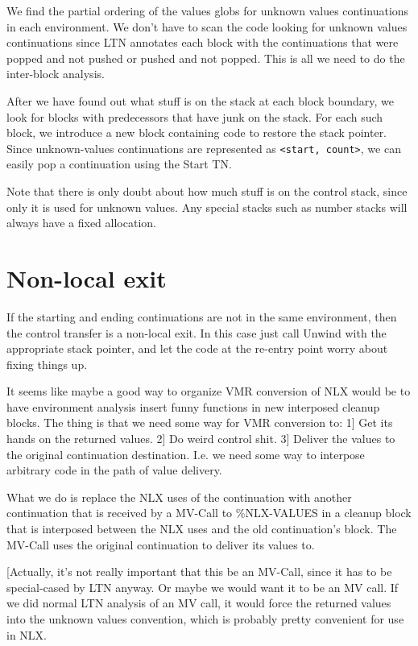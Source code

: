 We find the partial ordering of the values globs for unknown values
continuations in each environment.  We don't have to scan the code looking for
unknown values continuations since LTN annotates each block with the
continuations that were popped and not pushed or pushed and not popped.  This
is all we need to do the inter-block analysis.

After we have found out what stuff is on the stack at each block boundary, we
look for blocks with predecessors that have junk on the stack.  For each such
block, we introduce a new block containing code to restore the stack pointer.
Since unknown-values continuations are represented as \verb+<start, count>+, we can
easily pop a continuation using the Start TN.

Note that there is only doubt about how much stuff is on the control stack,
since only it is used for unknown values.  Any special stacks such as number
stacks will always have a fixed allocation.


\section{Non-local exit}


If the starting and ending continuations are not in the same environment, then
the control transfer is a non-local exit.  In this case just call Unwind with
the appropriate stack pointer, and let the code at the re-entry point worry
about fixing things up.

It seems like maybe a good way to organize VMR conversion of NLX would be to
have environment analysis insert funny functions in new interposed cleanup
blocks.  The thing is that we need some way for VMR conversion to:
 1] Get its hands on the returned values.
 2] Do weird control shit.
 3] Deliver the values to the original continuation destination.
I.e. we need some way to interpose arbitrary code in the path of value
delivery.

What we do is replace the NLX uses of the continuation with another
continuation that is received by a MV-Call to \%NLX-VALUES in a cleanup block
that is interposed between the NLX uses and the old continuation's block.  The
MV-Call uses the original continuation to deliver its values to.  

[Actually, it's not really important that this be an MV-Call, since it has to
be special-cased by LTN anyway.  Or maybe we would want it to be an MV call.
If we did normal LTN analysis of an MV call, it would force the returned values
into the unknown values convention, which is probably pretty convenient for use
in NLX.

